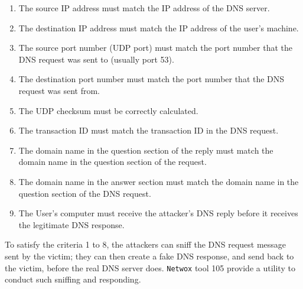 \begin{enumerate}

\item The source IP address must match the IP address of the DNS server.

\item The destination IP address must match the IP address of the user's machine.

\item The source port number (UDP port) must match the port number that the DNS
request was sent to (usually port 53).

\item The destination port number must match the port number that the DNS
request was sent from.

\item The UDP checksum must be correctly calculated. 

\item The transaction ID must match the transaction ID in the DNS request.

\item The domain name in the question section of the reply must match the 
domain name in the question section of the request.

\item The domain name in the answer section must match the domain name in the
question section of the DNS request.

\item The User's computer must receive the attacker's DNS reply before it
receives the legitimate DNS response.
\end{enumerate}


To satisfy the criteria 1 to 8, the attackers can sniff the DNS request message
sent by the victim; they can then create a fake DNS response, and send back to the victim,
before the real DNS server does. {\tt Netwox} tool 105 provide a utility to conduct
such sniffing and responding.

